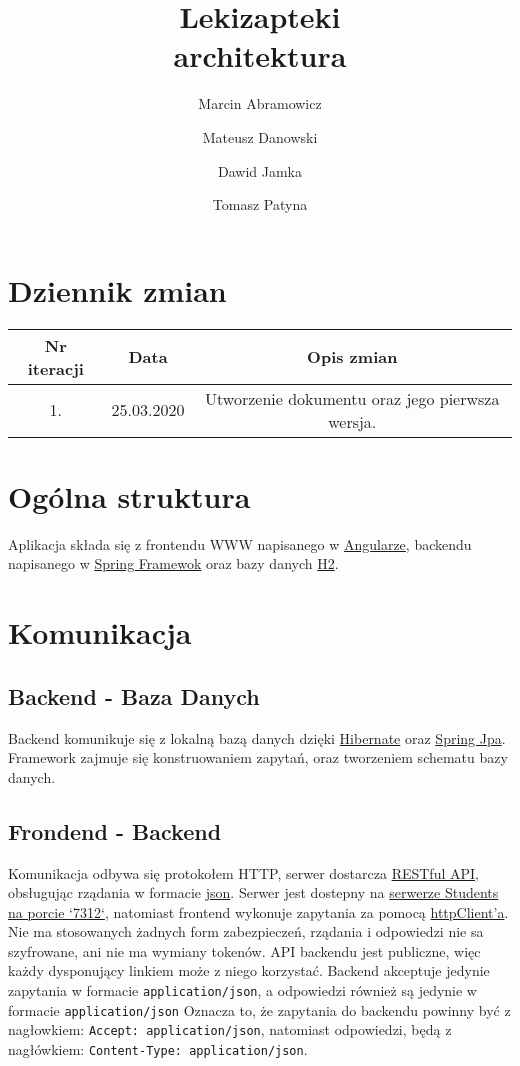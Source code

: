\documentclass{article}
\title{
Lekizapteki\\
\large architektura}
\author{Marcin Abramowicz \and Mateusz Danowski \and Dawid Jamka \and Tomasz Patyna}
\begin{document}
  \maketitle

  \section{Dziennik zmian}
    \begin{tabular}{|c|c|c|}
      Nr iteracji & Data & Opis zmian \\
      \hline
      1. & 25.03.2020 & Utworzenie dokumentu oraz jego pierwsza wersja. \\
    \end{tabular}

  \section{Ogólna struktura}
    Aplikacja składa się z frontendu WWW napisanego w
    \href{https://angular.io}{Angularze}, backendu napisanego w
    \href{https://spring.io}{Spring Framewok} oraz bazy danych
    \href {https://www.h2database.com/html/main.html}{H2}.

  \section{Komunikacja}
    \subsection{Backend - Baza Danych}
    Backend komunikuje się z lokalną bazą danych dzięki
    \href{https://hibernate.org}{Hibernate} oraz
    \href{https://spring.io/projects/spring-data-jpa} {Spring Jpa}.
    Framework zajmuje się konstruowaniem zapytań, oraz tworzeniem schematu bazy danych.

    \subsection{Frondend - Backend}
    Komunikacja odbywa się protokołem HTTP, serwer dostarcza
    \href{https://en.wikipedia.org/wiki/Representational_state_transfer}{RESTful API},
    obsługując rządania w formacie
    \href{https://en.wikipedia.org/wiki/JSON}{json}.
    Serwer jest dostepny na
    \href{http://students.mimuw.edu.pl:7312}{serwerze Students na porcie `7312`},
    natomiast frontend wykonuje zapytania za pomocą
    \href{https://angular.io/guide/http}{httpClient'a}.
    Nie ma stosowanych żadnych form zabezpieczeń, rządania i odpowiedzi nie sa szyfrowane, ani nie ma wymiany tokenów.
    API backendu jest publiczne, więc każdy dysponujący linkiem może z niego korzystać.
    Backend akceptuje jedynie zapytania w formacie \texttt{application/json},
    a odpowiedzi również są jedynie w formacie \texttt{application/json}
    Oznacza to, że zapytania do backendu powinny być z nagłowkiem: \texttt{Accept: application/json},
    natomiast odpowiedzi, będą z nagłówkiem: \texttt{Content-Type: application/json}.
\end{document}
